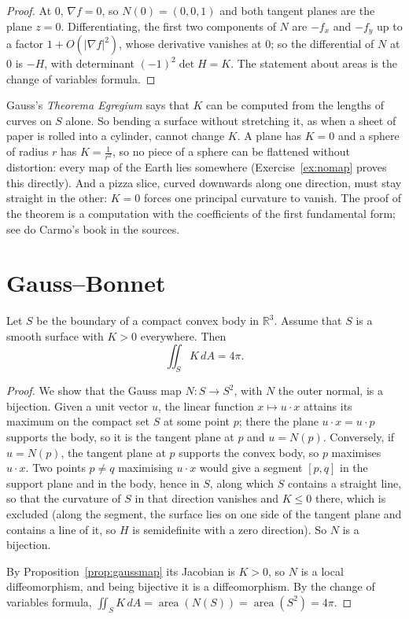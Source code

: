 \begin{proof}
At $0$, $\nabla f=0$, so $N(0)=(0,0,1)$ and both tangent planes are the plane $z=0$. Differentiating, the first two components of $N$ are $-f_x$ and $-f_y$ up to a
factor $1+O(|\nabla f|^2)$, whose derivative vanishes at $0$; so the differential of $N$ at $0$ is $-H$, with determinant $(-1)^2\det H=K$. The statement about
areas is the change of variables formula.
\end{proof}

\begin{remark}
Gauss's \emph{Theorema Egregium} says that $K$ can be computed from the lengths of curves on $S$ alone. So bending a surface without stretching it, as when a sheet of
paper is rolled into a cylinder, cannot change $K$. A plane has $K=0$ and a sphere of radius $r$ has $K=\frac1{r^2}$, so no piece of a sphere can be flattened without
distortion: every map of the Earth lies somewhere (Exercise~\ref{ex:nomap} proves this directly). And a pizza slice, curved downwards along one direction,
must stay straight in the other: $K=0$ forces one principal curvature to vanish. The proof of the theorem is a computation with the coefficients of the first
fundamental form; see do Carmo's book in the sources.
\end{remark}

\section{Gauss--Bonnet}

\begin{theorem}\label{thm:gbconvex}
Let $S$ be the boundary of a compact convex body in $\mathbb R^3$. Assume that $S$ is a smooth surface with $K>0$ everywhere. Then
\[
\iint_SK\,dA=4\pi.
\]
\end{theorem}

\begin{proof}
We show that the Gauss map $N:S\to S^2$, with $N$ the outer normal, is a bijection. Given a unit vector $u$, the linear function $x\mapsto u\cdot x$ attains its maximum
on the compact set $S$ at some point $p$; there the plane $u\cdot x=u\cdot p$ supports the body, so it is the tangent plane at $p$ and $u=N(p)$. Conversely, if $u=N(p)$, the
tangent plane at $p$ supports the convex body, so $p$ maximises $u\cdot x$. Two points $p\ne q$ maximising $u\cdot x$ would give a segment $[p,q]$ in the support plane
and in the body, hence in $S$, along which $S$ contains a straight line, so that the curvature of $S$ in that direction vanishes and $K\le0$ there, which is excluded
(along the segment, the surface lies on one side of the tangent plane and contains a line of it, so $H$ is semidefinite with a zero direction). So $N$ is a bijection.

By Proposition~\ref{prop:gaussmap} its Jacobian is $K>0$, so $N$ is a local diffeomorphism, and being bijective it is a diffeomorphism. By the change of variables
formula, $\iint_SK\,dA=\operatorname{area}(N(S))=\operatorname{area}(S^2)=4\pi$.
\end{proof}

